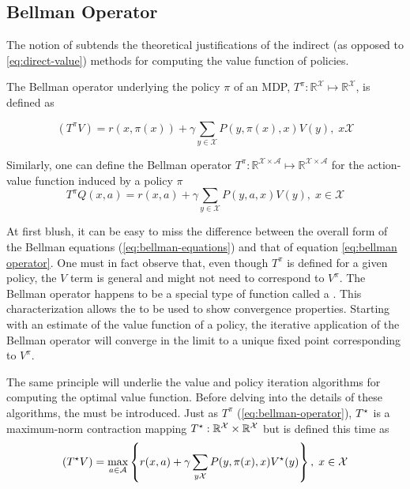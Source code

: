 \subsection{Bellman Operator}
The notion of  subtends the theoretical justifications of the
indirect (as opposed to \ref{eq:direct-value}) methods for computing the value
function of policies. 

\begin{defn}
The Bellman operator underlying the policy $\pi$ of an MDP, $T^\pi:
\mathbb{R}^\mathcal{X} \mapsto \mathbb{R}^\mathcal{X}$, is defined as

\begin{equation}
(T^\pi V) = r(x, \pi(x)) + \gamma \sum_{y \in \mathcal{X}} P(y, \pi(x), x) V(y), \; x
\mathcal{X} \label{eq:bellman-operator}
\end{equation}
\end{defn}

Similarly, one can define the Bellman operator $T^\pi : \mathbb{R}^{\mathcal{X}
\times \mathcal{A}} \mapsto \mathbb{R}^{\mathcal{X} \times \mathcal{A}}$  for the
action-value function induced by a policy $\pi$
\begin{equation}
T^\pi Q(x, a) = r(x, a) + \gamma \sum_{y \in \mathcal{X}} P(y, a, x) V(y), \; x \in
\mathcal{X} \label{eq:bellman-operator-action-value}
\end{equation}

At first blush, it can be easy to miss the difference between the overall form of the
Bellman equations (\ref{eq:bellman-equations}) and that of equation \ref{eq:bellman
operator}. One must in fact observe that, even though $T^\pi$ is defined for a given
policy, the $V$ term is general and might not need to correspond to $V^\pi$. 
The Bellman operator happens to be a special type of function called a
. This characterization allows the  to be used to show convergence properties.  Starting with an
estimate of the value function of a policy, the iterative application of the Bellman
operator will converge in the limit to a unique fixed point corresponding to $V^\pi$.

The same principle will underlie the value and policy iteration algorithms for
computing the optimal value function. Before delving into the details of these
algorithms, the  must be introduced. Just as
$T^\pi$ (\ref{eq:bellman-operator}), $T^\star$ is a maximum-norm contraction
mapping $T^\star: \mathbb{R}^\mathcal{X} \times \mathbb{R}^\mathcal{X}$ but 
is defined this time as
\begin{equation}
(T^\star V) = \max_{a \in \mathcal{A}} \left\lbrace r(x, a) + \gamma \sum_{y
\mathcal{X}} P(y, \pi(x), x) V^\star (y) \right\rbrace, \; x \in \mathcal{X} 
\label{eq:bellman-optimality-operator}
\end{equation}

